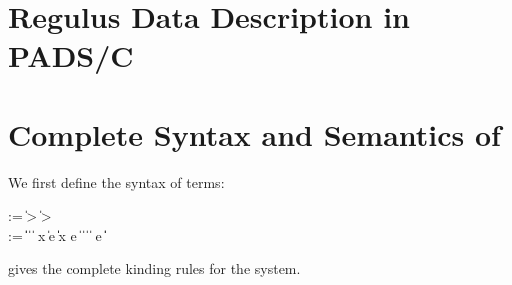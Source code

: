 \appendix
\section{Regulus Data Description in PADS/C}
\label{app:regulus-padsc}


\section{Complete Syntax and Semantics of \ddc{}}
\label{app:ddc-semantics}
We first define the syntax of \ddc{} terms:

{\small
\begin{bnf}
   \meta{\gk} \::= \kty \| \ity \-> \gk 
                               \| \kty \-> \gk \\
   \meta{\ty} \::= 
    \ptrue\| \pfalse \|  \| 
    \plam{\var}{\ity}{\ty} \|  \nlalt
    \psig x \ty \ty \| \psum \ty e \ty \| \pand \ty \ty \|
    \pset x \ty e \| \pseq \ty {} \nlalt
    \ptyvar       \| \pmu{\ptyvar}{\gk}{\ty} \| \ptylam{\ptyvar}{\kty}{\ty} \| \ptyapp{\ty}{\ty}
    \nlalt \pcompute e \ity \| \pabsorb \ty \| \pscan{\ty}  
\end{bnf}
}

\noindent
{} gives the complete kinding rules for the
system.

